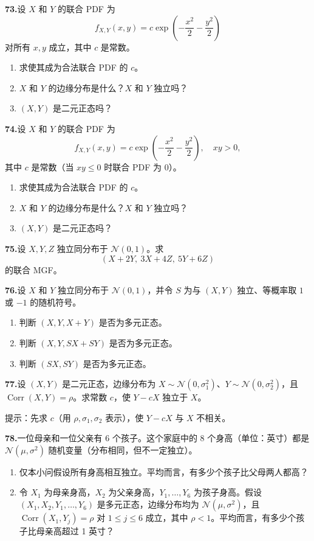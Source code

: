 \documentclass[UTF8,12pt,a4paper,fontset=fandol]{ctexart}
\begin{document}
\noindent\textbf{73.}\quad 设 $X$ 和 $Y$ 的联合 PDF 为
\[
  f_{X,Y}(x,y)=c\exp\left(-\frac{x^2}{2}-\frac{y^2}{2}\right)
\]
对所有 $x,y$ 成立，其中 $c$ 是常数。
\begin{enumerate}
  \item[(a)] 求使其成为合法联合 PDF 的 $c$。
  \item[(b)] $X$ 和 $Y$ 的边缘分布是什么？$X$ 和 $Y$ 独立吗？
  \item[(c)] $(X,Y)$ 是二元正态吗？
\end{enumerate}

\noindent\textbf{74.}\quad 设 $X$ 和 $Y$ 的联合 PDF 为
\[
  f_{X,Y}(x,y)=c\exp\left(-\frac{x^2}{2}-\frac{y^2}{2}\right),\quad xy>0,
\]
其中 $c$ 是常数（当 $xy\le 0$ 时联合 PDF 为 $0$）。
\begin{enumerate}
  \item[(a)] 求使其成为合法联合 PDF 的 $c$。
  \item[(b)] $X$ 和 $Y$ 的边缘分布是什么？$X$ 和 $Y$ 独立吗？
  \item[(c)] $(X,Y)$ 是二元正态吗？
\end{enumerate}

\noindent\textbf{75.}\quad 设 $X,Y,Z$ 独立同分布于 $\mathcal{N}(0,1)$。求
\[
  (X+2Y,\ 3X+4Z,\ 5Y+6Z)
\]
的联合 MGF。

\noindent\textbf{76.}\quad 设 $X$ 和 $Y$ 独立同分布于 $\mathcal{N}(0,1)$，并令 $S$ 为与 $(X,Y)$ 独立、等概率取 $1$ 或 $-1$ 的随机符号。
\begin{enumerate}
  \item[(a)] 判断 $(X,Y,X+Y)$ 是否为多元正态。
  \item[(b)] 判断 $(X,Y,SX+SY)$ 是否为多元正态。
  \item[(c)] 判断 $(SX,SY)$ 是否为多元正态。
\end{enumerate}

\noindent\textbf{77.}\quad 设 $(X,Y)$ 是二元正态，边缘分布为 $X\sim \mathcal{N}(0,\sigma_1^2)$、$Y\sim \mathcal{N}(0,\sigma_2^2)$，且 $\operatorname{Corr}(X,Y)=\rho$。求常数 $c$，使 $Y-cX$ 独立于 $X$。

提示：先求 $c$（用 $\rho,\sigma_1,\sigma_2$ 表示），使 $Y-cX$ 与 $X$ 不相关。

\noindent\textbf{78.}\quad 一位母亲和一位父亲有 6 个孩子。这个家庭中的 8 个身高（单位：英寸）都是 $\mathcal{N}(\mu,\sigma^2)$ 随机变量（分布相同，但不一定独立）。
\begin{enumerate}
  \item[(a)] 仅本小问假设所有身高相互独立。平均而言，有多少个孩子比父母两人都高？
  \item[(b)] 令 $X_1$ 为母亲身高，$X_2$ 为父亲身高，$Y_1,\ldots,Y_6$ 为孩子身高。假设 $(X_1,X_2,Y_1,\ldots,Y_6)$ 是多元正态，边缘分布均为 $\mathcal{N}(\mu,\sigma^2)$，且 $\operatorname{Corr}(X_1,Y_j)=\rho$ 对 $1\le j\le 6$ 成立，其中 $\rho<1$。平均而言，有多少个孩子比母亲高超过 1 英寸？
\end{enumerate}
\end{document}
